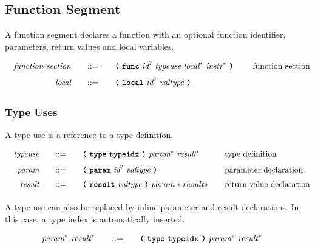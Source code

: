 \subsection{Function Segment}

A function segment declares a function with an optional function identifier, parameters, return values and local variables.

\begin{alignat*}{9}
    && \textit{function-section}    &&\quad ::= &\quad && \textbf{\texttt{(}}\ \textbf{\texttt{func}}\ \textit{id}^?\ \textit{typeuse}\ \textit{local}^*\ \textit{instr}^*\ \textbf{\texttt{)}}\ \quad && \textrm{function section} \\[1mm]
    && \textit{local}    &&\quad ::= &\quad && \textbf{\texttt{(}}\ \textbf{\texttt{local}}\ \textit{id}^?\ \textit{valtype}\ \textbf{\texttt{)}}\ &&\\[1mm]
\end{alignat*}

\subsubsection{Type Uses}

A type use is a reference to a type definition.

\begin{alignat*}{9}
    && \textit{typeuse}    &&\quad ::= &\quad && \textbf{\texttt{(}}\ \textbf{\texttt{type}}\ \textbf{\texttt{typeidx}}\ \textbf{\texttt{)}}\ \textit{param}^*\ \textit{result}^*\ \quad && \textrm{type definition} \\[1mm]
    && \textit{param}    &&\quad ::= &\quad && \textbf{\texttt{(}}\ \textbf{\texttt{param}}\ \textit{id}^?\ \textit{valtype}\ \textbf{\texttt{)}}\ \quad && \textrm{parameter declaration} \\[1mm]
    && \textit{result}    &&\quad ::= &\quad && \textbf{\texttt{(}}\ \textbf{\texttt{result}}\ \textit{valtype}\ \textbf{\texttt{)}}\ param* result* \quad && \textrm{return value declaration} \\[1mm]
\end{alignat*}

A type use can also be replaced by inline parameter and result declarations. In this case, a type index is automatically inserted.

\begin{alignat*}{9}
    && \textit{param}^*\ \textit{result}^*  &&\quad ::= &\quad && \textbf{\texttt{(}}\ \textbf{\texttt{type}}\ \textbf{\texttt{typeidx}}\ \textbf{\texttt{)}}\ \textit{param}^*\ \textit{result}^*\ \quad &&  \\[1mm]
\end{alignat*}

